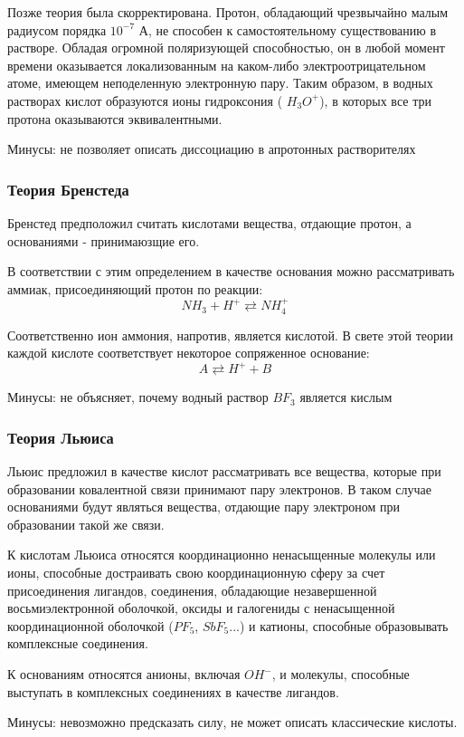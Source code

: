 \documentclass[14pt,a4paper]{scrartcl}
\begin{document}
Позже теория была скорректирована. Протон, обладающий чрезвычайно малым радиусом порядка  $10^{-7} $ А, не способен к самостоятельному существованию в растворе. Обладая огромной поляризующей способностью, он в любой момент времени оказывается локализованным на каком-либо электроотрицательном атоме, имеющем неподеленную электронную пару. Таким образом, в водных растворах кислот образуются ионы гидроксония ( $H_3O^+ $),  в которых все три протона оказываются эквивалентными.

Минусы: не позволяет описать диссоциацию в апротонных растворителях
\subsubsection*{Теория Бренстеда}


Бренстед предположил считать кислотами вещества, отдающие протон, а основаниями - принимаюзщие его.

В соответствии с этим определением в качестве основания можно рассматривать аммиак, присоединяющий протон по реакции:
 $$NH_3 + H^+ \rightleftarrows NH_4^+ $$

Соответственно ион аммония, напротив, является кислотой. В свете этой теории каждой кислоте соответствует некоторое сопряженное основание:
 $$ A \rightleftarrows H^+ + B$$
 
 Минусы: не объясняет, почему водный раствор $BF_3$ является кислым
 
 \subsubsection*{Теория Льюиса}

 
 Льюис предложил в качестве кислот рассматривать все вещества, которые при образовании ковалентной связи принимают пару электронов. В таком случае основаниями будут являться вещества, отдающие пару электроном при образовании такой же связи.
 
 К кислотам Льюиса относятся координационно ненасыщенные молекулы или ионы, способные достраивать свою координационную сферу за счет присоединения лигандов, соединения, обладающие незавершенной восьмиэлектронной оболочкой, оксиды и галогениды с ненасыщенной координационной оболочкой ($PF_5$, $SbF_5$...) и катионы, способные образовывать комплексные соединения.
 
 К основаниям относятся анионы, включая $OH^-$, и молекулы, способные выступать в комплексных  соединениях в качестве лигандов.
 
 Минусы: невозможно предсказать силу, не может описать классические кислоты.
\end{document}
